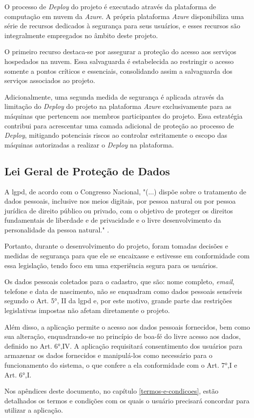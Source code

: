 O processo de \textit{\gls{Deploy}} do projeto é executado através da plataforma de computação em nuvem da \textit{\gls{Azure}}. A própria plataforma \textit{\gls{Azure}} disponibiliza uma série de recursos dedicados à segurança para seus usuários, e esses recursos são integralmente empregados no âmbito deste projeto.

O primeiro recurso destaca-se por assegurar a proteção do acesso aos serviços hospedados na nuvem. Essa salvaguarda é estabelecida ao restringir o acesso somente a pontos críticos e essenciais, consolidando assim a salvaguarda dos serviços associados ao projeto.

Adicionalmente, uma segunda medida de segurança é aplicada através da limitação do \textit{\gls{Deploy}} do projeto na plataforma \textit{\gls{Azure}} exclusivamente para as máquinas que pertencem aos membros participantes do projeto. Essa estratégia contribui para acrescentar uma camada adicional de proteção ao processo de \textit{\gls{Deploy}}, mitigando potenciais riscos ao controlar estritamente o escopo das máquinas autorizadas a realizar o \textit{\gls{Deploy}} na plataforma.

\subsection{Lei Geral de Proteção de Dados}
A \ac{lgpd}, de acordo com o Congresso Nacional, "(...) dispõe sobre o tratamento de dados pessoais, inclusive nos meios digitais, por pessoa natural ou por pessoa jurídica de direito público ou privado, com o objetivo de proteger os direitos fundamentais de liberdade e de privacidade e o livre desenvolvimento da personalidade da pessoa natural." \cite{lgpd}.

Portanto, durante o desenvolvimento do projeto, foram tomadas decisões e
medidas de segurança para que ele se encaixasse e estivesse em conformidade com essa legislação, tendo foco em uma experiência segura para os usuários.

Os dados pessoais coletados para o cadastro, que são: nome completo, \textit{email}, telefone e data de nascimento, não se enquadram como dados pessoais sensíveis segundo o Art. 5°, II da \ac{lgpd} e, por este motivo, grande parte das restrições legislativas impostas não afetam diretamente o projeto.

Além disso, a aplicação permite o acesso aos dados pessoais fornecidos, bem como sua alteração, enquadrando-se no princípio de boa-fé do livre acesso aos dados, definido no Art. 6°,IV. A aplicação requisitará consentimento dos usuários para armazenar os dados fornecidos e manipulá-los como necessário para o funcionamento do sistema, o que confere a ela conformidade com o Art. 7°,I e Art. 6°,I.

Nos apêndices deste documento, no capítulo \ref{termos-e-condicoes}, estão detalhados os termos e condições com os quais o usuário precisará concordar para utilizar a aplicação.